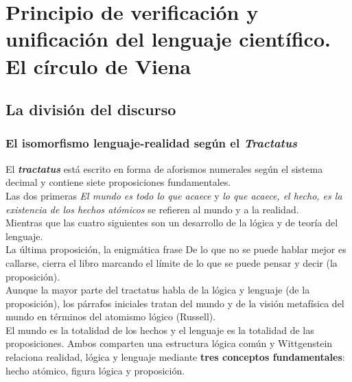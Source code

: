 \documentclass[a4paper, 11pt, twocolumn, spanish]{article}
\begin{document}
\section{Principio de verificación y unificación del lenguaje científico. El círculo de Viena}
\label{sec:orge6e7353}
\subsection{La división del discurso}
\label{sec:org15ea999}
\subsubsection{El isomorfismo lenguaje-realidad según el \emph{Tractatus}}
\label{sec:orgd9d7653}
El \textbf{\emph{tractatus}} está escrito en forma de aforismos numerales según el
sistema decimal y contiene siete proposiciones fundamentales.\\[0pt]
Las dos primeras \emph{El mundo es todo lo que acaece} y \emph{lo que acaece, el
hecho, es la existencia de los hechos atómicos} se refieren al mundo y
a la realidad.\\[0pt]
Mientras que las cuatro siguientes son un desarrollo de la lógica y de
teoría del lenguaje.\\[0pt]
La última proposición, la enigmática frase De lo que no se puede
hablar mejor es callarse, cierra el libro marcando el límite de lo que
se puede pensar y decir (la proposición).\\[0pt]
Aunque la mayor parte del tractatus habla de la lógica y lenguaje (de
la proposición), los párrafos iniciales tratan del mundo y de la
visión metafísica del mundo en términos del atomismo lógico
(Russell).\\[0pt]
El mundo es la totalidad de los hechos y el lenguaje es la totalidad
de las proposiciones. Ambos comparten una estructura lógica común y
Wittgenstein relaciona realidad, lógica y lenguaje mediante \textbf{tres
conceptos fundamentales}: hecho atómico, figura lógica y
proposición.\\[0pt]
\end{document}

